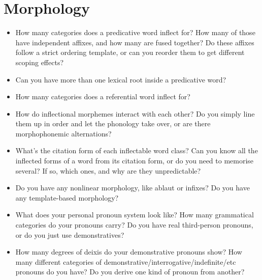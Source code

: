 \documentclass{article}
\begin{document}
\section{Morphology}
\begin{itemize}
  \item How many categories does a predicative word inflect for? How many of those have independent affixes, and how many are fused together? Do these affixes follow a strict ordering template, or can you reorder them to get different scoping effects?
  \item Can you have more than one lexical root inside a predicative word?
  \item How many categories does a referential word inflect for?
  \item How do inflectional morphemes interact with each other? Do you simply line them up in order and let the phonology take over, or are there morphophonemic alternations?
  \item What's the citation form of each inflectable word class? Can you know all the inflected forms of a word from its citation form, or do you need to memorise several? If so, which ones, and why are they unpredictable?
  \item Do you have any nonlinear morphology, like ablaut or infixes? Do you have any template-based morphology?
  \item What does your personal pronoun system look like? How many grammatical categories do your pronouns carry? Do you have real third-person pronouns, or do you just use demonstratives?
  \item How many degrees of deixis do your demonstrative pronouns show? How many different categories of demonstrative/interrogative/indefinite/etc pronouns do you have? Do you derive one kind of pronoun from another?
\end{itemize}
\end{document}
